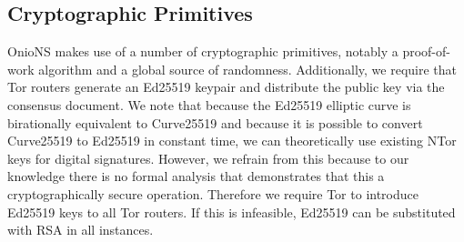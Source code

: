 \documentclass[conference]{IEEEtran}
\begin{document}
\subsection{Cryptographic Primitives}

OnioNS makes use of a number of cryptographic primitives, notably a proof-of-work algorithm and a global source of randomness. Additionally, we require that Tor routers generate an Ed25519\cite{bernstein2011high} keypair and distribute the public key via the consensus document. We note that because the Ed25519 elliptic curve is birationally equivalent to Curve25519\cite{bernstein2006curve25519} and because it is possible to convert Curve25519 to Ed25519 in constant time, we can theoretically use existing NTor\cite{goldberg2013anonymity} keys for digital signatures. However, we refrain from this because to our knowledge there is no formal analysis that demonstrates that this a cryptographically secure operation. Therefore we require Tor to introduce Ed25519 keys to all Tor routers. If this is infeasible, Ed25519 can be substituted with RSA in all instances.
\end{document}
